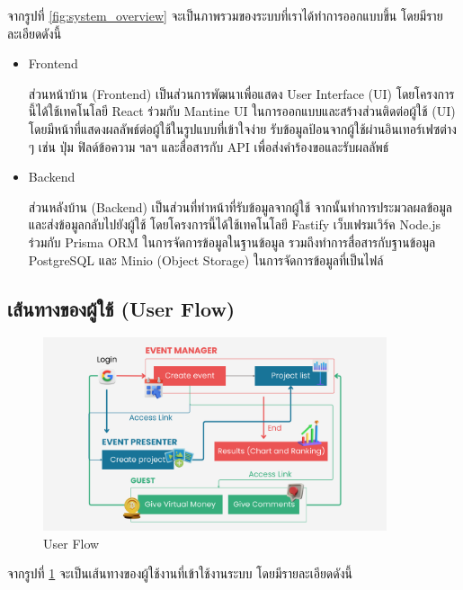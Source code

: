 จากรูปที่ \ref{fig:system_overview} จะเป็นภาพรวมของระบบที่เราได้ทำการออกแบบขึ้น โดยมีรายละเอียดดังนี้
\begin{itemize}
    \item Frontend

          ส่วนหน้าบ้าน (Frontend) เป็นส่วนการพัฒนาเพื่อแสดง User Interface (UI) โดยโครงการนี้ได้ใช้เทคโนโลยี React ร่วมกับ Mantine UI ในการออกแบบและสร้างส่วนติดต่อผู้ใช้ (UI) โดยมีหน้าที่แสดงผลลัพธ์ต่อผู้ใช้ในรูปแบบที่เข้าใจง่าย รับข้อมูลป้อนจากผู้ใช้ผ่านอินเทอร์เฟซต่าง ๆ เช่น ปุ่ม ฟิลด์ข้อความ ฯลฯ และสื่อสารกับ API เพื่อส่งคำร้องขอและรับผลลัพธ์
    \item Backend

          ส่วนหลังบ้าน (Backend) เป็นส่วนที่ทำหน้าที่รับข้อมูลจากผู้ใช้ จากนั้นทำการประมวลผลข้อมูล และส่งข้อมูลกลับไปยังผู้ใช้ โดยโครงการนี้ได้ใช้เทคโนโลยี Fastify เว็บเฟรมเวิร์ค Node.js ร่วมกับ Prisma ORM ในการจัดการข้อมูลในฐานข้อมูล รวมถึงทำการสื่อสารกับฐานข้อมูล PostgreSQL และ Minio (Object Storage) ในการจัดการข้อมูลที่เป็นไฟล์
\end{itemize}

\subsection{เส้นทางของผู้ใช้ (User Flow)}
\begin{figure}[h]
    \begin{center}
        \includegraphics[width=0.9\textwidth]{img/userflow.png}
    \end{center}
    \caption{User Flow}
    \label{fig:user_flow}
\end{figure}

จากรูปที่ \ref{fig:user_flow} จะเป็นเส้นทางของผู้ใช้งานที่เข้าใช้งานระบบ โดยมีรายละเอียดดังนี้

